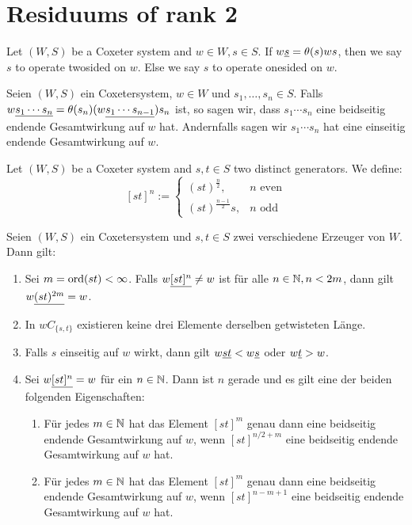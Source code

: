 \section{Residuums of rank 2}

\begin{defi}
	Let $(W,S)$ be a Coxeter system and $w \in W, s \in S$. If $w \underline{s} = \theta(s)ws$, then we say $s$ to operate twosided on $w$. Else we say $s$ to operate onesided on $w$.
\end{defi}

\begin{defi}
	Seien $(W,S)$ ein Coxetersystem, $w \in W$ und $s_1,\ldots,s_n \in S$. Falls $w \underline{s_1 \cdots s_n} = \theta(s_n)(w \underline{s_1 \cdots s_{n-1}}) s_n$ ist, so sagen wir, dass $s_1 \cdots s_n$ eine beidseitig endende Gesamtwirkung auf $w$ hat. Andernfalls sagen wir $s_1 \cdots s_n$ hat eine einseitig endende Gesamtwirkung auf $w$.
\end{defi}

\begin{defi}
	Let $(W,S)$ be a Coxeter system and $s,t \in S$ two distinct generators. We define:
	$$[st]^n :=
	\begin{cases}
	(st)^{\frac{n}{2}}, & n \textrm{ even} \\
	(st)^{\frac{n-1}{2}}s, & n \textrm{ odd} 
	\end{cases}$$
\end{defi}

\begin{assu}
Seien $(W,S)$ ein Coxetersystem und $s,t \in S$ zwei verschiedene Erzeuger
von $W$. Dann gilt:
\begin{enumerate}
	\item \label{max-twocycle-length} Sei $m = \operatorname{ord} (st) < \infty$. Falls
	$w \underline{[st]^n} \neq w$ ist für alle $n \in \mathbb{N}, n < 2m$, dann gilt $w \underline{(st)^{2m}} = w$.
	\item In $wC_{\{s,t\}}$ existieren keine drei Elemente derselben getwisteten Länge.
	\item Falls $s$ einseitig auf $w$ wirkt, dann gilt $w \underline{st} < w \underline{s}$ oder $w \underline{t} > w$.
	\item \label{twocycle-symmetry} Sei $w \underline{[st]^n} = w$ für ein $n \in
	\mathbb{N}$. Dann ist $n$ gerade und es gilt eine der beiden folgenden Eigenschaften:
		\begin{enumerate}
			\item Für jedes $m \in \mathbb{N}$ hat das Element $[st]^m$ genau dann eine
			beidseitig endende Gesamt\-wirkung auf $w$, wenn $[st]^{n/2+m}$ eine
			beidseitig endende Gesamtwirkung auf $w$ hat.
			\item Für jedes $m \in \mathbb{N}$ hat das Element $[st]^m$ genau dann eine
			beidseitig endende Gesamt\-wirkung auf $w$, wenn $[st]^{n-m+1}$ eine
			beidseitig endende Gesamtwirkung auf $w$ hat.
		\end{enumerate}
\end{enumerate}
\end{assu}

